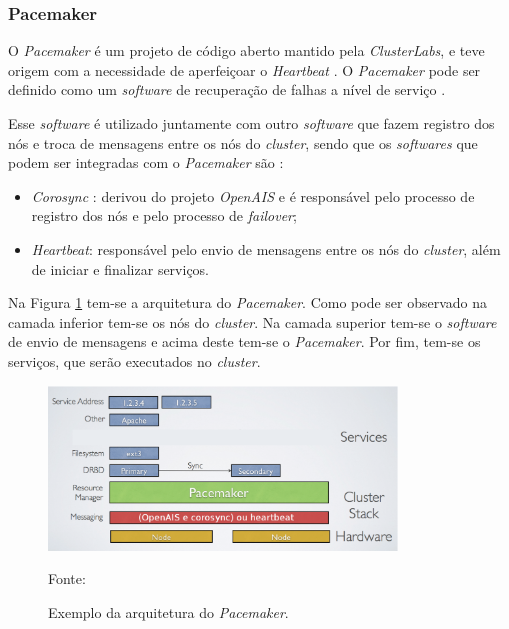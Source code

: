 
\subsubsection{Pacemaker}
\label{section:pacemaker}
O \textit{Pacemaker} \cite{pacemaker} é um projeto de código aberto mantido pela \textit{ClusterLabs}, e teve origem com a necessidade de 
aperfeiçoar o \textit{Heartbeat} \cite{heartbeat}. 
O \textit{Pacemaker} pode ser definido como um \textit{software} de recuperação de falhas a nível de serviço \cite{perkov2011}. 

Esse \textit{software} é utilizado juntamente com outro \textit{software} que fazem registro dos nós e troca de mensagens entre os nós do 
\textit{cluster}, sendo que os \textit{softwares} que podem ser integradas com o \textit{Pacemaker} são \cite{pacemaker}:
\begin{itemize}
 \item \textit{Corosync} \cite{corosync}: derivou do projeto \textit{OpenAIS} e é responsável pelo processo de registro dos nós e pelo processo 
 de \textit{failover};
 \item \textit{Heartbeat}: responsável pelo envio de mensagens entre os nós do \textit{cluster}, além de iniciar e finalizar serviços.
\end{itemize}


Na Figura \ref{fig:pacemaker_tools} tem-se a arquitetura do \textit{Pacemaker}. Como pode ser observado na camada inferior tem-se os nós do 
\textit{cluster}. Na camada superior tem-se o \textit{software} de envio de mensagens e acima deste tem-se o \textit{Pacemaker}. 
Por fim, tem-se os serviços, que serão executados no \textit{cluster}.

\begin{figure}[h!]
 \centering
 \includegraphics[width=350px]{img/pacemaker_tools.eps}
 \caption{Exemplo da arquitetura do \textit{Pacemaker}.}
 Fonte: \citet{pacemaker}
 \label{fig:pacemaker_tools}
\end{figure}

